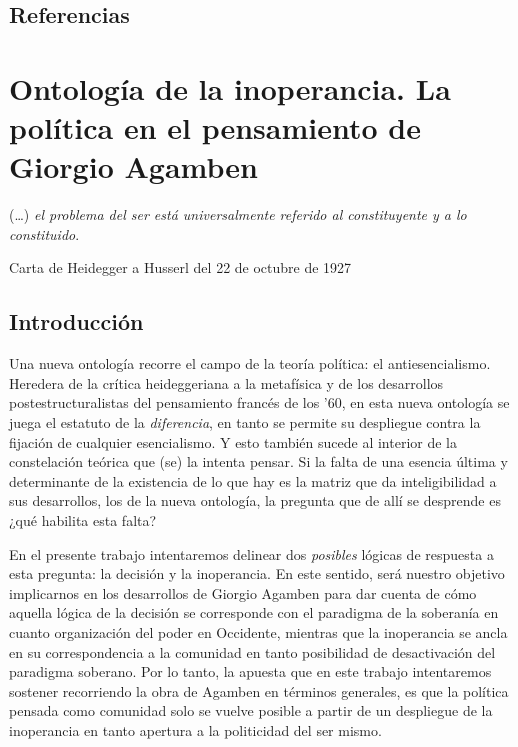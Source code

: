 \section*{Referencias}
\printbibliography[heading=none]   %


\chapter[Ontología de la inoperancia...]{Ontología de la inoperancia. La política en el pensamiento de Giorgio Agamben}


\epigraph{(\ldots) \emph{el problema del ser está universalmente referido al constituyente y a lo constituido}.}{Carta de Heidegger a Husserl del 22 de octubre de 1927}


\section{Introducción}

Una nueva ontología recorre el campo de la teoría política: el antiesencialismo. Heredera de la crítica heideggeriana a la metafísica y de los desarrollos postestructuralistas del pensamiento francés de los '60, en esta nueva ontología se juega el estatuto de la \emph{diferencia}, en tanto se permite su despliegue contra la fijación de cualquier esencialismo. Y esto también sucede al interior de la constelación teórica que (se) la intenta pensar. Si la falta de una esencia última y determinante de la existencia de lo que hay es la matriz que da inteligibilidad a sus desarrollos, los de la nueva ontología, la pregunta que de allí se desprende es ¿qué habilita esta falta?

En el presente trabajo intentaremos delinear dos \emph{posibles} lógicas de respuesta a esta pregunta: la decisión y la inoperancia. En este sentido, será nuestro objetivo implicarnos en los desarrollos de Giorgio Agamben para dar cuenta de cómo aquella lógica de la decisión se corresponde con el paradigma de la soberanía en cuanto organización del poder en Occidente, mientras que la inoperancia se ancla en su correspondencia a la comunidad en tanto posibilidad de desactivación del paradigma soberano. Por lo tanto, la apuesta que en este trabajo intentaremos sostener recorriendo la obra de Agamben en términos generales, es que la política pensada como comunidad solo se vuelve posible a partir de un despliegue de la inoperancia en tanto apertura a la politicidad del ser mismo.


